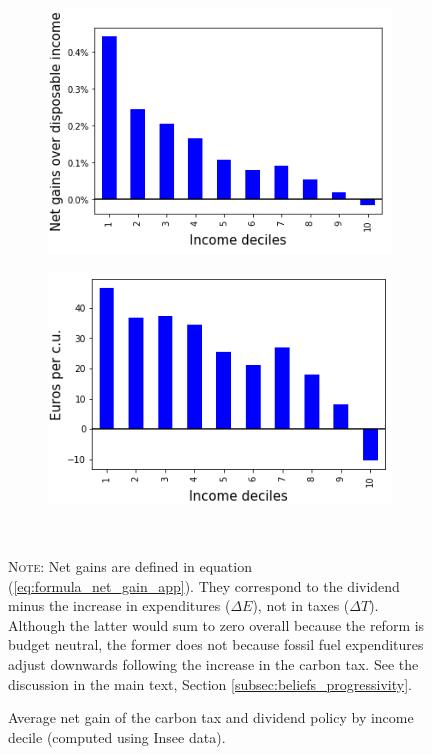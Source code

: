 \documentclass[12pt]{article} %
\begin{document}
\begin{appendices}
\begin{figure}[H]
\begin{subfigure}{.5\textwidth}
\centering
\includegraphics[scale=0.9]{Images/effort_rate_uc.png}
\end{subfigure}\hfill
\begin{subfigure}{.5\textwidth}
\centering
\includegraphics[scale=0.9]{Images/average_cost_decile.png}
\end{subfigure} \\[1ex]
{\footnotesize  \parbox[t]{15.5cm } {\linespread{1.2}\selectfont \textsc{Note:} Net gains are defined in equation (\ref{eq:formula_net_gain_app}). They correspond to the dividend minus the increase in expenditures ($\Delta E$), not in taxes ($\Delta T$). Although the latter would sum to zero overall because the reform is budget neutral, the former does not because fossil fuel expenditures adjust downwards following the increase in the carbon tax. See the discussion in the main text, Section \vref{subsec:beliefs_progressivity}.}
\caption{Average net gain of the carbon tax and dividend policy by income decile (computed using Insee data).\label{figure:effort_rate_uc}}
}
\end{figure}


\end{appendices}
\end{document}
